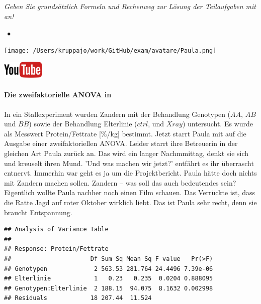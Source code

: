 \documentclass[a4paper, 9pt]{scrartcl}\usepackage[]{graphicx}\usepackage[]{xcolor}
\makeatletter
\newenvironment{kframe}{%
 \def\at@end@of@kframe{}%
 \ifinner\ifhmode%
  \def\at@end@of@kframe{\end{minipage}}%
  \begin{minipage}{\columnwidth}%
 \fi\fi%
 \def\FrameCommand##1{\hskip\@totalleftmargin \hskip-\fboxsep
 \colorbox{shadecolor}{##1}\hskip-\fboxsep
     \hskip-\linewidth \hskip-\@totalleftmargin \hskip\columnwidth}%
 \MakeFramed {\advance\hsize-\width
   \@totalleftmargin\z@ \linewidth\hsize
   \@setminipage}}%
 {\par\unskip\endMakeFramed%
 \at@end@of@kframe}
\newenvironment{knitrout}{}{} %
\makeatother
\begin{document}
\textit{Geben Sie grundsätzlich Formeln und Rechenweg zur Lösung der Teilaufgaben mit an!} \\[1Ex]
 

 
\ifcollection
\begin{flushright}
\tiny\vspace{-3Ex}
\textbf{\examinhaltstart}
\exammodulestatversuch $\;\bullet$
\exammodulebiostat
\vspace{-4Ex}
\end{flushright}
\begin{minipage}[t]{0.5\textwidth}
\texttt{[image: /Users/kruppajo/work/GitHub/exam/avatare/Paula.png]}
\end{minipage}
\begin{minipage}[t]{0.5\textwidth}
\hfill
\href{https://youtu.be/rWTyHXXlYjY}{\includegraphics[width = 2cm]{img/youtube}}
\end{minipage}
\vspace{-3Ex}
\fi



\ifcollection
\paragraph{Die zweifaktorielle ANOVA in \Rlogo}
\fi

In ein Stallexperiment wurden Zandern mit der Behandlung Genotypen ($AA$, $AB$ und $BB$) sowie der Behandlung Elterlinie ($ctrl$, und $Xray$) untersucht. Es wurde als Messwert Protein/Fettrate [\%/kg] bestimmt. Jetzt starrt Paula mit auf die \Rlogo Ausgabe einer zweifaktoriellen ANOVA. Leider starrt ihre Betreuerin in der gleichen Art Paula zurück an. Das wird ein langer Nachmmittag, denkt sie sich und kreuselt ihren Mund. 'Und was machen wir jetzt?' entfährt es ihr überrascht entnervt. Immerhin war geht es ja um die Projektbericht. Paula hätte doch nichts mit Zandern machen sollen. Zandern -- was soll das auch bedeutendes sein? Eigentlich wollte Paula nachher noch einen Film schauen. Das Verrückte ist, dass die Ratte Jagd auf roter Oktober wirklich liebt. Das ist Paula sehr recht, denn sie braucht Entspannung.

\begin{knitrout}
\color{fgcolor}\begin{kframe}
\begin{verbatim}
## Analysis of Variance Table
## 
## Response: Protein/Fettrate
##                      Df Sum Sq Mean Sq F value   Pr(>F)
## Genotypen             2 563.53 281.764 24.4496 7.39e-06
## Elterlinie            1   0.23   0.235  0.0204 0.888095
## Genotypen:Elterlinie  2 188.15  94.075  8.1632 0.002998
## Residuals            18 207.44  11.524
\end{verbatim}
\end{kframe}
\end{knitrout}
\end{document}

